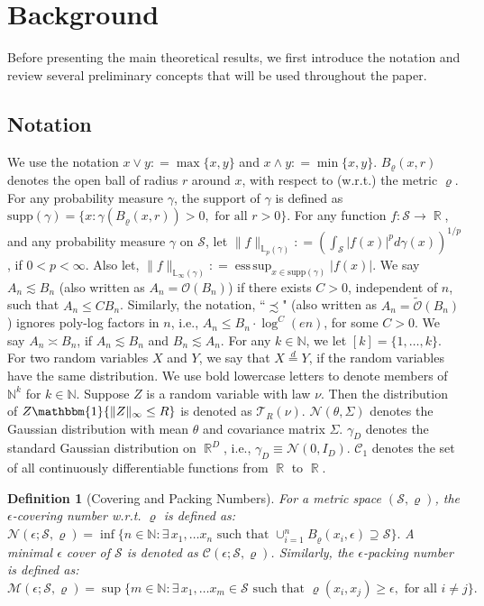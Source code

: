 \documentclass[12pts]{article}
\newtheorem{defn}{Definition}%
\def\Real{\mathop{\mathbb{R}}\nolimits}
\newcommand{\one}{\mathbbm{1}}
\newcommand{\cC}{ \mathcal{C}}
\newcommand{\cM}{ \mathcal{M}}
\newcommand{\cN}{ \mathcal{N}}
\newcommand{\cO}{ \mathcal{O}}
\newcommand{\cS}{ \mathcal{S}}
\newcommand{\sC}{ \mathscr{C}}
\newcommand{\sT}{ \mathscr{T}}
\newcommand{\fL}{\mathbb{L}}
\begin{document}
\section{Background}\label{background}
Before presenting the main theoretical results, we first introduce the notation and review several preliminary concepts that will be used throughout the paper.

\subsection{Notation}
We use the notation $x \vee y : = \max\{x,y\}$ and $x \wedge y : = \min\{x,y\}$.  
$B_\varrho(x,r)$ denotes the open ball of radius $r$ around $x$, with respect to (w.r.t.) the metric $\varrho$. 
For any probability measure $\gamma$, the support of $\gamma$ is defined as $\text{supp}(\gamma) = \{x: \gamma(B_\varrho(x,r))>0, \text{ for all }r >0\}$.  For any function $f: \cS \to \Real$, and any probability measure $\gamma$ on $\cS$, let $\|f\|_{\fL_p(\gamma)} : = \left(\int_\cS |f(x)|^p d \gamma(x) \right)^{1/p}$, if $0<p< \infty$. Also let, $\|f\|_{\fL_\infty(\gamma)} : = \operatorname{ess\, sup}_{x \in \text{supp}(\gamma)}|f(x)|$. 
We say $A_n \lesssim B_n$ (also written as $A_n = \cO(B_n)$) if there exists $C>0$, independent of $n$, such that $A_n \le C B_n$. Similarly, the notation, ``$\precsim$" (also written as $A_n = \widetilde{\cO}(B_n)$) ignores poly-log factors in  $n$, i.e., $A_n \le B_n \cdot \log^C(en)$, for some $C>0$. We say $A_n \asymp B_n$, if $A_n \lesssim B_n$ and $B_n \lesssim A_n$. For any $k \in \mathbb{N}$, we let $[k] = \{1, \dots, k\}$. For two random variables $X$ and $Y$, we say that $X  \overset{d}{=} Y$, if the random variables have the same distribution. We use bold lowercase letters to denote members of $\mathbb{N}^k$ for $k \in \mathbb{N}$. 
Suppose $Z$ is a random variable with law $\nu$. Then the distribution of $Z\one\{\|Z\|_\infty \le R\}$ is denoted as $\sT_R(\nu)$. $\cN(\theta, \Sigma)$ denotes the Gaussian distribution with mean $\theta$ and covariance matrix $\Sigma$. $\gamma_D$ denotes the standard Gaussian distribution on $\Real^D$, i.e., $\gamma_D \equiv \cN(0, I_D)$. $\sC_1$ denotes the set of all continuously differentiable functions from $\Real$ to $\Real$. 
\begin{defn}[Covering and Packing Numbers] 
    \normalfont 
    For a metric space $(\cS,\varrho)$, the $\epsilon$-covering number w.r.t. $\varrho$ is defined as:
    \(\cN(\epsilon; \cS, \varrho) = \inf\{n \in \mathbb{N}: \exists \, x_1, \dots x_n \text{ such that } \cup_{i=1}^nB_\varrho(x_i, \epsilon) \supseteq \cS\}.\) A minimal $\epsilon$ cover of $\cS$ is denoted as $\cC(\epsilon; \cS, \varrho)$.
    Similarly, the $\epsilon$-packing number is defined as:
    \(\cM(\epsilon; \cS, \varrho) = \sup\{m \in \mathbb{N}: \exists \, x_1, \dots x_m \in \cS \text{ such that } \varrho(x_i, x_j) \ge \epsilon, \text{ for all } i \neq j\}.\)
\end{defn}
\end{document}
